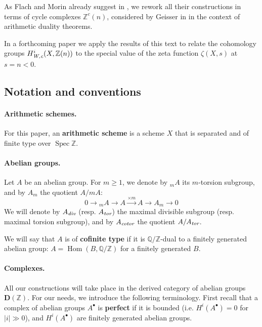 \documentclass[leqno,12pt]{article}
\theoremstyle{plain}
\theoremstyle{definition}
\DeclareMathOperator{\Spec}{Spec}
\DeclareMathOperator{\Hom}{Hom}
\DeclareMathOperator{\Ext}{Ext}
\newcommand{\QQ}{\mathbb{Q}}
\newcommand{\ZZ}{\mathbb{Z}}
\renewcommand{\div}{\text{\it div}}
\newcommand{\tor}{\text{\it tor}}
\newcommand{\cotor}{\text{\it cotor}}
\newcommand{\Wc}{\text{\it W,c}}
\newcommand{\DZ}{{\mathbf{D} (\ZZ)}}
\begin{document}
As Flach and Morin already suggest in \cite[Remark 3.11]{Flach-Morin-2018},
we rework all their constructions in terms of cycle complexes $\ZZ^c (n)$,
considered by Geisser in \cite{Geisser-2010} in the context of arithmetic
duality theorems.

In a forthcoming paper we apply the results of this text to relate the
cohomology groups $H_\Wc^i (X, \ZZ(n))$ to the special value of the zeta
function $\zeta (X, s)$ at $s = n < 0$.

\subsection*{Notation and conventions}

\paragraph{Arithmetic schemes.}
For this paper, an \textbf{arithmetic scheme} is a scheme $X$ that is separated
and of finite type over $\Spec \ZZ$.

\paragraph{Abelian groups.}
Let $A$ be an abelian group. For $m \ge 1$, we denote by ${}_m A$ its
$m$-torsion subgroup, and by $A_m$ the quotient $A/mA$:
$$0 \to {}_m A \to A \xrightarrow{\times m} A \to A_m \to 0$$
We will denote by
$A_\div$ (resp. $A_\tor$) the maximal divisible subgroup (resp. maximal torsion
subgroup), and by $A_\cotor$ the quotient $A/A_\tor$.


We will say that $A$ is of \textbf{cofinite type} if it is $\QQ/\ZZ$-dual to a
finitely generated abelian group: $A = \Hom (B,\QQ/\ZZ)$ for a finitely
generated $B$.

\paragraph{Complexes.}
All our constructions will take place in the derived category of abelian groups
$\DZ$. For our needs, we introduce the following terminology.  First recall that
a complex of abelian groups $A^\bullet$ is \textbf{perfect} if it is bounded
(i.e. $H^i (A^\bullet) = 0$ for $|i| \gg 0$), and $H^i (A^\bullet)$ are finitely
generated abelian groups.
\end{document}
